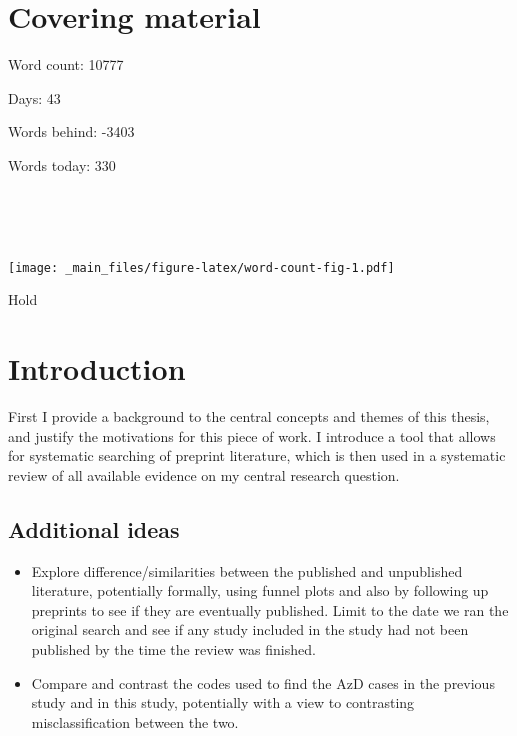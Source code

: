 \documentclass[a4paper, twoside]{templates/ociamthesis}
\providecommand{\tightlist}{%
  \setlength{\itemsep}{0pt}\setlength{\parskip}{0pt}}
\begin{document}
\flushbottom

\hypertarget{covering-material}{%
\chapter*{Covering material}\label{covering-material}}

\adjustmtc

Word count: 10777

Days: 43

Words behind: -3403

Words today: 330

~

~

\texttt{[image: \_main\_files/figure-latex/word-count-fig-1.pdf]}

\begin{savequote}
Hold
\end{savequote}



\hypertarget{intro-heading}{%
\chapter{Introduction}\label{intro-heading}}

\minitoc 

First I provide a background to the central concepts and themes of this thesis, and justify the motivations for this piece of work. I introduce a tool that allows for systematic searching of preprint literature, which is then used in a systematic review of all available evidence on my central research question.

\hypertarget{additional-ideas}{%
\section{Additional ideas}\label{additional-ideas}}

\begin{itemize}
\tightlist
\item
  Explore difference/similarities between the published and unpublished literature, potentially formally, using funnel plots and also by following up preprints to see if they are eventually published. Limit to the date we ran the original search and see if any study included in the study had not been published by the time the review was finished.
\item
  Compare and contrast the codes used to find the AzD cases in the previous study and in this study, potentially with a view to contrasting misclassification between the two.
\end{itemize}
\end{document}
